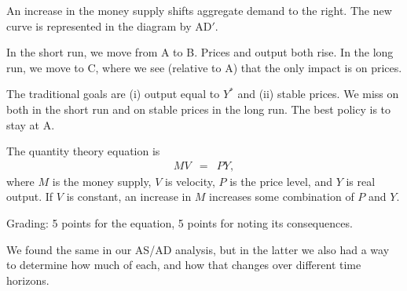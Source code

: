 \documentclass[letterpaper,12pt]{exam}
\begin{document}
\begin{questions}
\begin{solution}
\begin{center}
\begin{picture}
\end{picture}
\end{center}


\begin{parts}
\item An increase in the money supply shifts aggregate demand to the right.
The new curve is represented in the diagram by AD$'$.

\item In the short run, we move from A to B.  Prices and output both rise.
In the long run, we move to C, where we see (relative to A) that the only impact is on prices.

\item The traditional goals are (i) output equal to $Y^*$ and
(ii) stable prices.
We miss on both in the short run and on stable prices in the long run.
The best policy is to stay at A.

\item The quantity theory equation is
\begin{eqnarray*}
    M V &=& P Y ,
\end{eqnarray*}
where $M$ is the money supply, $V$ is velocity,
$P$ is the price level, and $Y$ is real output.
If $V$ is constant, an increase in $M$ increases some combination
of $P$ and $Y$.

Grading:  5 points for the equation, 5 points for noting its consequences.

\item We found the same in our AS/AD analysis,
but in the latter
we also had a way to determine how much of each,
and how that changes over different time horizons.
\end{parts}
\end{solution}


\end{questions}
\end{document}
